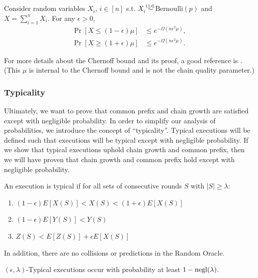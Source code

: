 \begin{theorem}
Consider random variables ${X_i}$, ${i\in [n]}$ s.t. $X_i \overset{\text{i.i.d.}}{\sim} \mathrm{Bernoulli}(p)$ and $X = \sum_{i=1}^{n} X_i$. For any $\epsilon > 0$,
\begin{align}
    \Pr[X \leq (1 - \epsilon) \mu ] &\leq e^{-\Omega(n\epsilon^2\mu)}, \\
    \Pr[X \geq (1 + \epsilon) \mu ] &\leq e^{-\Omega(n\epsilon^2\mu)}.
\end{align}
\end{theorem}
For more details about the Chernoff bound and its proof, a good reference is \cite{chernoff1952measure}.
(This $\mu$ is internal to the Chernoff bound and is not the chain quality parameter.)


\subsubsection{Typicality}

Ultimately, we want to prove that common prefix and chain growth are satisfied except with negligible probability. In order to simplify our analysis of probabilities, we introduce the concept of ``typicality''. Typical executions will be defined such that executions will be typical except with negligible probability. If we show that typical executions uphold chain growth and common prefix, then we will have proven that chain growth and common prefix hold except with negligible probability.

\begin{definition}
An execution is typical if for all sets of consecutive rounds $S$ with $|S| \geq \lambda$:
\begin{enumerate}
    \item $(1-\epsilon) E[X(S)] < X(S) < (1+\epsilon) E[X(S)]$
    \item $(1-\epsilon) E[Y(S)] < Y(S) $
    \item $ Z(S) < E[Z(S)] + \epsilon E[X(S)] $
\end{enumerate}
In addition, there are no collisions or predictions in the Random Oracle.
\end{definition}

\begin{theorem}
$(\epsilon,\lambda)$-Typical executions occur with probability at least $1-\mathrm{negl}(\lambda)$.
\end{theorem}

